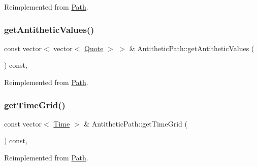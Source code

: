 Reimplemented from \hyperlink{class_path_ae6097f4761ac45d2d3656c35f09563f0}{Path}.

\hypertarget{class_antithetic_path_a7b6c87162d9c4642dda68b4f9af5f653}{}\label{class_antithetic_path_a7b6c87162d9c4642dda68b4f9af5f653} 
\subsubsection{\texorpdfstring{get\+Antithetic\+Values()}{getAntitheticValues()}\hspace{0.1cm}{\footnotesize\ttfamily [2/2]}}
{\footnotesize\ttfamily const vector$<$ vector$<$ \hyperlink{_name_def_8h_a642a6c5fd87319d922637de0e0bb0305}{Quote} $>$ $>$ \& Antithetic\+Path\+::get\+Antithetic\+Values (\begin{DoxyParamCaption}{ }\end{DoxyParamCaption}) const\hspace{0.3cm}{\ttfamily [override]}, {\ttfamily [virtual]}}



Reimplemented from \hyperlink{class_path_aadadd7f7ad38c779e36f3ef2805f30e9}{Path}.

\hypertarget{class_antithetic_path_a8986e32381ea393159a15dc2b1c0b12c}{}\label{class_antithetic_path_a8986e32381ea393159a15dc2b1c0b12c} 
\subsubsection{\texorpdfstring{get\+Time\+Grid()}{getTimeGrid()}}
{\footnotesize\ttfamily const vector$<$ \hyperlink{_name_def_8h_ac2d3e0ba793497bcca555c7c2cf64ff3}{Time} $>$ \& Antithetic\+Path\+::get\+Time\+Grid (\begin{DoxyParamCaption}{ }\end{DoxyParamCaption}) const\hspace{0.3cm}{\ttfamily [override]}, {\ttfamily [virtual]}}



Reimplemented from \hyperlink{class_path_a774bc2169ae87142b8165c3934a9deb9}{Path}.

\hypertarget{class_antithetic_path_a631294808de3c75c98563f292464a7da}{}\label{class_antithetic_path_a631294808de3c75c98563f292464a7da} 
